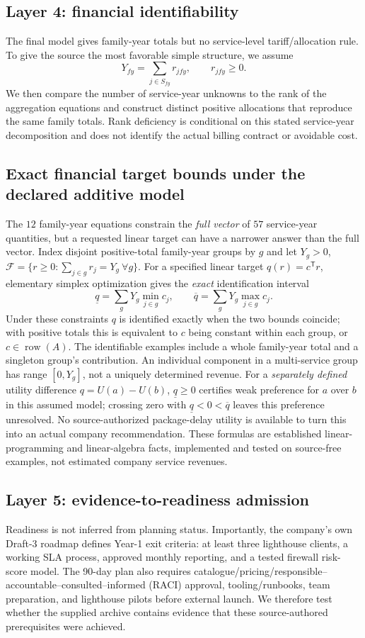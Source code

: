 \documentclass[systems,article,submit,moreauthors]{Definitions/mdpi}
\begin{document}
\subsection{Layer 4: financial identifiability}
The final model gives family-year totals but no service-level tariff/allocation rule. To give the source the most favorable simple structure, we assume
\[
Y_{fy}=\sum_{j\in S_{fy}} r_{jfy},\qquad r_{jfy}\ge0.
\]
We then compare the number of service-year unknowns to the rank of the aggregation equations and construct distinct positive allocations that reproduce the same family totals. Rank deficiency is conditional on this stated service-year decomposition and does not identify the actual billing contract or avoidable cost.


\subsection{Exact financial target bounds under the declared additive model}
The $12$ family-year equations constrain the \emph{full vector} of $57$ service-year quantities, but a requested linear target can have a narrower answer than the full vector. Index disjoint positive-total family-year groups by $g$ and let $Y_g>0$, $\mathcal F=\{r\geq0:\sum_{j\in g}r_j=Y_g\ \forall g\}$. For a specified linear target $q(r)=c^{\mathsf T}r$, elementary simplex optimization gives the \emph{exact} identification interval
\[
\underline q=\sum_g Y_g\min_{j\in g}c_j,\qquad
\overline q=\sum_g Y_g\max_{j\in g}c_j.
\]
Under these constraints $q$ is identified exactly when the two bounds coincide; with positive totals this is equivalent to $c$ being constant within each group, or $c\in\operatorname{row}(A)$. The identifiable examples include a whole family-year total and a singleton group's contribution. An individual component in a multi-service group has range $[0,Y_g]$, not a uniquely determined revenue. For a \emph{separately defined} utility difference $q=U(a)-U(b)$, $\underline q\geq0$ certifies weak preference for $a$ over $b$ in this assumed model; crossing zero with $\underline q<0<\overline q$ leaves this preference unresolved. No source-authorized package-delay utility is available to turn this into an actual company recommendation. These formulas are established linear-programming and linear-algebra facts, implemented and tested on source-free examples, not estimated company service revenues.\label{sec:target-bounds}


\subsection{Layer 5: evidence-to-readiness admission}
Readiness is not inferred from planning status. Importantly, the company's own Draft-3 roadmap defines Year-1 exit criteria: at least three lighthouse clients, a working SLA process, approved monthly reporting, and a tested firewall risk-score model. The 90-day plan also requires catalogue/pricing/responsible--accountable--consulted--informed (RACI) approval, tooling/runbooks, team preparation, and lighthouse pilots before external launch. We therefore test whether the supplied archive contains evidence that these source-authored prerequisites were achieved.
\end{document}
